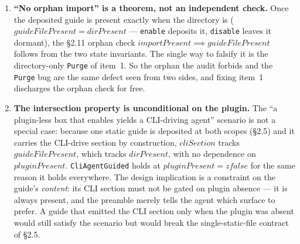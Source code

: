 \documentclass[a4paper,10pt,fleqn]{article}
\begin{document}
\begin{enumerate}
  \item \textbf{``No orphan import'' is a theorem, not an independent check.}
    Once the deposited guide is present exactly when the directory is
    ($guideFilePresent = dirPresent$ --- \texttt{enable} deposits it,
    \texttt{disable} leaves it dormant), the \S2.11 orphan check $importPresent
    \implies guideFilePresent$ follows from the two state invariants. The single
    way to falsify it is the directory-only \texttt{Purge} of item~1. So the
    orphan the audit forbids and the \texttt{Purge} bug are the same defect seen
    from two sides, and fixing item~1 discharges the orphan check for free.

  \item \textbf{The intersection property is unconditional on the plugin.} The
    ``a plugin-less box that enables yields a CLI-driving agent'' scenario is not
    a special case: because one static guide is deposited at both scopes (\S2.5)
    and it carries the CLI-drive section by construction, $cliSection$ tracks
    $guideFilePresent$, which tracks $dirPresent$, with no dependence on
    $pluginPresent$. \texttt{CliAgentGuided} holds at $pluginPresent = zfalse$
    for the same reason it holds everywhere. The design implication is a
    constraint on the guide's \emph{content}: its CLI section must not be gated
    on plugin absence --- it is always present, and the preamble merely tells the
    agent which surface to prefer. A guide that emitted the CLI section only when
    the plugin was absent would still satisfy the scenario but would break the
    single-static-file contract of \S2.5.
\end{enumerate}
\end{document}
